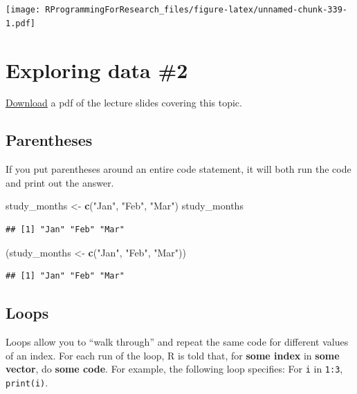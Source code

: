 \documentclass[]{book}
\makeatletter
\newenvironment{Shaded}{\begin{snugshade}}{\end{snugshade}}
\newcommand{\KeywordTok}[1]{\textcolor[rgb]{0.13,0.29,0.53}{\textbf{{#1}}}}
\newcommand{\StringTok}[1]{\textcolor[rgb]{0.31,0.60,0.02}{{#1}}}
\newcommand{\NormalTok}[1]{{#1}}
\newenvironment{kframe}{%
\medskip{}
\setlength{\fboxsep}{.8em}
 \def\at@end@of@kframe{}%
 \ifinner\ifhmode%
  \def\at@end@of@kframe{\end{minipage}}%
  \begin{minipage}{\columnwidth}%
 \fi\fi%
 \def\FrameCommand##1{\hskip\@totalleftmargin \hskip-\fboxsep
 \colorbox{shadecolor}{##1}\hskip-\fboxsep
     \hskip-\linewidth \hskip-\@totalleftmargin \hskip\columnwidth}%
 \MakeFramed {\advance\hsize-\width
   \@totalleftmargin\z@ \linewidth\hsize
   \@setminipage}}%
 {\par\unskip\endMakeFramed%
 \at@end@of@kframe}
\renewenvironment{Shaded}{\begin{kframe}}{\end{kframe}}
\makeatother
\begin{document}
\texttt{[image: RProgrammingForResearch\_files/figure-latex/unnamed-chunk-339-1.pdf]}

\chapter{Exploring data \#2}\label{exploring-data-2}

\href{https://github.com/geanders/RProgrammingForResearch/raw/master/slides/CourseNotes_Week7.pdf}{Download}
a pdf of the lecture slides covering this topic.

\section{Parentheses}\label{parentheses}

If you put parentheses around an entire code statement, it will both run
the code and print out the answer.

\begin{Shaded}
\begin{Highlighting}[]
\NormalTok{study_months <-}\StringTok{ }\KeywordTok{c}\NormalTok{(}\StringTok{"Jan"}\NormalTok{, }\StringTok{"Feb"}\NormalTok{, }\StringTok{"Mar"}\NormalTok{)}
\NormalTok{study_months}
\end{Highlighting}
\end{Shaded}

\begin{verbatim}
## [1] "Jan" "Feb" "Mar"
\end{verbatim}

\begin{Shaded}
\begin{Highlighting}[]
\NormalTok{(study_months <-}\StringTok{ }\KeywordTok{c}\NormalTok{(}\StringTok{"Jan"}\NormalTok{, }\StringTok{"Feb"}\NormalTok{, }\StringTok{"Mar"}\NormalTok{))}
\end{Highlighting}
\end{Shaded}

\begin{verbatim}
## [1] "Jan" "Feb" "Mar"
\end{verbatim}

\section{Loops}\label{loops}

Loops allow you to ``walk through'' and repeat the same code for
different values of an index. For each run of the loop, R is told that,
for \textbf{some index} in \textbf{some vector}, do \textbf{some code}.
For example, the following loop specifies: For \texttt{i} in
\texttt{1:3}, \texttt{print(i)}.
\end{document}
